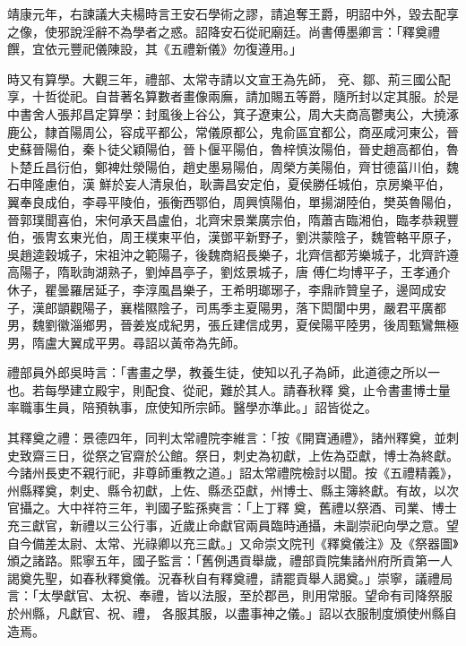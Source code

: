 \begin{pinyinscope}
 靖康元年，右諫議大夫楊時言王安石學術之謬，請追奪王爵，明詔中外，毀去配享之像，使邪說淫辭不為學者之惑。詔降安石從祀廟廷。尚書傅墨卿言：「釋奠禮饌，宜依元豐祀儀陳設，其《五禮新儀》勿復遵用。」



 時又有算學。大觀三年，禮部、太常寺請以文宣王為先師，
 兗、鄒、荊三國公配享，十哲從祀。自昔著名算數者畫像兩廡，請加賜五等爵，隨所封以定其服。於是中書舍人張邦昌定算學：封風後上谷公，箕子遼東公，周大夫商高鬱夷公，大撓涿鹿公，隸首陽周公，容成平都公，常儀原都公，鬼俞區宜都公，商巫咸河東公，晉史蘇晉陽伯，秦卜徒父穎陽伯，晉卜偃平陽伯，魯梓慎汝陽伯，晉史趙高都伯，魯卜楚丘昌衍伯，鄭裨灶滎陽伯，趙史墨易陽伯，周榮方美陽伯，齊甘德菑川伯，魏石申隆慮伯，漢
 鮮於妄人清泉伯，耿壽昌安定伯，夏侯勝任城伯，京房樂平伯，翼奉良成伯，李尋平陵伯，張衡西鄂伯，周興慎陽伯，單揚湖陸伯，樊英魯陽伯，晉郭璞聞喜伯，宋何承天昌盧伯，北齊宋景業廣宗伯，隋蕭吉臨湘伯，臨孝恭親豐伯，張冑玄東光伯，周王樸東平伯，漢鄧平新野子，劉洪蒙陰子，魏管輅平原子，吳趙逵穀城子，宋祖沖之範陽子，後魏商紹長樂子，北齊信都芳樂城子，北齊許遵高陽子，隋耿詢湖熟子，劉焯昌亭子，劉炫景城子，唐
 傅仁均博平子，王孝通介休子，瞿曇羅居延子，李淳風昌樂子，王希明瑯琊子，李鼎祚贊皇子，邊岡成安子，漢郎顗觀陽子，襄楷隰陰子，司馬季主夏陽男，落下閎閬中男，嚴君平廣都男，魏劉徽淄鄉男，晉姜岌成紀男，張丘建信成男，夏侯陽平陸男，後周甄鸞無極男，隋盧大翼成平男。尋詔以黃帝為先師。



 禮部員外郎吳時言：「書畫之學，教養生徒，使知以孔子為師，此道德之所以一也。若每學建立殿宇，則配食、從祀，難於其人。請春秋釋
 奠，止令書畫博士量率職事生員，陪預執事，庶使知所宗師。醫學亦準此。」詔皆從之。



 其釋奠之禮：景德四年，同判太常禮院李維言：「按《開寶通禮》，諸州釋奠，並刺史致齋三日，從祭之官齋於公館。祭日，刺史為初獻，上佐為亞獻，博士為終獻。今諸州長吏不親行祀，非尊師重教之道。」詔太常禮院檢討以聞。按《五禮精義》，州縣釋奠，刺史、縣令初獻，上佐、縣丞亞獻，州博士、縣主簿終獻。有故，以次官攝之。大中祥符三年，判國子監孫奭言：「上丁釋
 奠，舊禮以祭酒、司業、博士充三獻官，新禮以三公行事，近歲止命獻官兩員臨時通攝，未副崇祀向學之意。望自今備差太尉、太常、光祿卿以充三獻。」又命崇文院刊《釋奠儀注》及《祭器圖》頒之諸路。熙寧五年，國子監言：「舊例遇貢舉歲，禮部貢院集諸州府所貢第一人謁奠先聖，如春秋釋奠儀。況春秋自有釋奠禮，請罷貢舉人謁奠。」崇寧，議禮局言：「太學獻官、太祝、奉禮，皆以法服，至於郡邑，則用常服。望命有司降祭服於州縣，凡獻官、祝、禮，
 各服其服，以盡事神之儀。」詔以衣服制度頒使州縣自造焉。




\end{pinyinscope}

